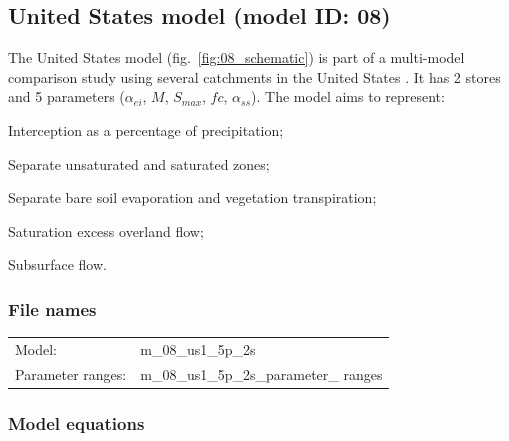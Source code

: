 \subsection{United States model (model ID: 08)}
The United States model (fig.~\ref{fig:08_schematic}) is part of a multi-model comparison study using several catchments in the United States \citep{Bai2009}. It has 2 stores and 5 parameters ($\alpha_{ei}$, $M$, $S_{max}$, $fc$, $\alpha_{ss}$). The model aims to represent:

\begin{itemizecompact}
\item Interception as a percentage of precipitation;
\item Separate unsaturated and saturated zones;
\item Separate bare soil evaporation and vegetation transpiration;
\item Saturation excess overland flow;
\item Subsurface flow.
\end{itemizecompact}

\subsubsection{File names}
\begin{tabular}{@{}ll}
Model: &m\_08\_us1\_5p\_2s \\
Parameter ranges: &m\_08\_us1\_5p\_2s\_parameter\_ ranges \\
\end{tabular}

\subsubsection{Model equations}


